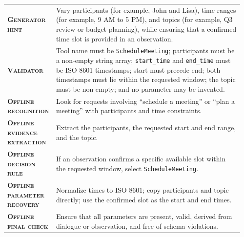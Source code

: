 \begin{table}[htbp]
\centering
\begin{minipage}{0.97\textwidth}
\raggedright
\small
\setlength{\tabcolsep}{3pt}
\renewcommand{\arraystretch}{1.16}
\vspace{0.35em}
\begin{tabular}{@{}>{\raggedright\arraybackslash\bfseries}p{0.17\linewidth} >{\raggedright\arraybackslash}p{0.79\linewidth}@{}}
    \textsc{Generator hint} & Vary participants (for example, John and Lisa), time ranges (for example, 9 AM to 5 PM), and topics (for example, Q3 review or budget planning), while ensuring that a confirmed time slot is provided in an observation. \\
    \textsc{Validator} & Tool name must be \texttt{ScheduleMeeting}; participants must be a non-empty string array; \texttt{start\_time} and \texttt{end\_time} must be ISO 8601 timestamps; start must precede end; both timestamps must lie within the requested window; the topic must be non-empty; and no parameter may be invented. \\
    \textsc{Offline recognition} & Look for requests involving ``schedule a meeting'' or ``plan a meeting'' with participants and time constraints. \\
    \textsc{Offline evidence extraction} & Extract the participants, the requested start and end range, and the topic. \\
    \textsc{Offline decision rule} & If an observation confirms a specific available slot within the requested window, select \texttt{ScheduleMeeting}. \\
    \textsc{Offline parameter recovery} & Normalize times to ISO 8601; copy participants and topic directly; use the confirmed slot as the start and end times. \\
    \textsc{Offline final check} & Ensure that all parameters are present, valid, derived from dialogue or observation, and free of schema violations. \\
\end{tabular}
\vspace{0.45em}
\end{minipage}
\end{table}

